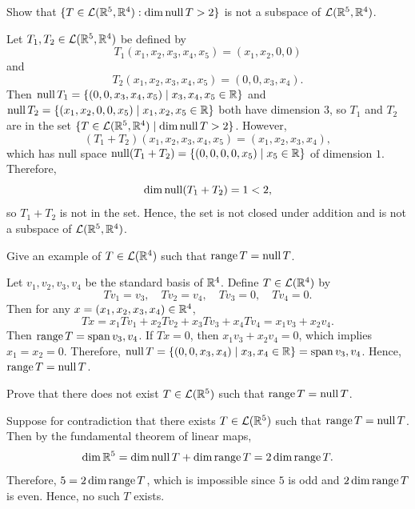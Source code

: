 \begin{exc}
\begin{exercise}
Show that $\{T\in\mathcal{L}(\mathbb{R}^5,\mathbb{R}^4) : \operatorname{dim}\operatorname{null} T>2\}$ is not a subspace of
$\mathcal{L}(\mathbb{R}^5,\mathbb{R}^4)$.
\end{exercise}
\begin{solution}
Let $T_1,T_2\in\mathcal{L}(\mathbb{R}^5,\mathbb{R}^4)$ be defined by
\[ T_1(x_1,x_2,x_3,x_4,x_5)=(x_1,x_2,0,0) \]
and
\[ T_2(x_1,x_2,x_3,x_4,x_5)=(0,0,x_3,x_4). \]
Then $\operatorname{null} T_1=\{(0,0,x_3,x_4,x_5)\mid x_3,x_4,x_5\in\mathbb{R}\}$ and
$\operatorname{null} T_2=\{(x_1,x_2,0,0,x_5)\mid x_1,x_2,x_5\in\mathbb{R}\}$ both have dimension
$3$, so $T_1$ and $T_2$ are in the set
$\{T\in\mathcal{L}(\mathbb{R}^5,\mathbb{R}^4)\mid\operatorname{dim}\operatorname{null} T>2\}$. However,
\[ (T_1+T_2)(x_1,x_2,x_3,x_4,x_5)=(x_1,x_2,x_3,x_4), \]
which has null space $\operatorname{null}(T_1+T_2)=\{(0,0,0,0,x_5)\mid x_5\in\mathbb{R}\}$ of
dimension $1$. Therefore,
\[ \operatorname{dim}\operatorname{null}(T_1+T_2)=1<2, \]
so $T_1+T_2$ is not in the set. Hence, the set is not closed under addition
and is not a subspace of $\mathcal{L}(\mathbb{R}^5,\mathbb{R}^4)$.
\end{solution}

\begin{exercise}
Give an example of $T\in\mathcal{L}(\mathbb{R}^4)$ such that $\operatorname{range} T=\operatorname{null} T$.
\end{exercise}
\begin{solution}
Let $v_1,v_2,v_3,v_4$ be the standard basis of $\mathbb{R}^4$. Define
$T\in\mathcal{L}(\mathbb{R}^4)$ by
\[ Tv_1=v_3, \quad Tv_2=v_4, \quad Tv_3=0, \quad Tv_4=0. \]
Then for any $x=(x_1,x_2,x_3,x_4)\in\mathbb{R}^4$,
\[ Tx=x_1Tv_1+x_2Tv_2+x_3Tv_3+x_4Tv_4=x_1v_3+x_2v_4. \]
Then $\operatorname{range} T=\operatorname{span} v_3,v_4$. If $Tx=0$, then $x_1v_3+x_2v_4=0$, which
implies $x_1=x_2=0$. Therefore,
$\operatorname{null} T=\{(0,0,x_3,x_4)\mid x_3,x_4\in\mathbb{R}\}=\operatorname{span} v_3,v_4$. Hence,
$\operatorname{range} T=\operatorname{null} T$.
\end{solution}

\begin{exercise}
Prove that there does not exist $T\in\mathcal{L}(\mathbb{R}^5)$ such that
$\operatorname{range} T=\operatorname{null} T$.
\end{exercise}
\begin{solution}
Suppose for contradiction that there exists $T\in\mathcal{L}(\mathbb{R}^5)$ such that
$\operatorname{range} T=\operatorname{null} T$. Then by the fundamental theorem of linear maps,
\[ \operatorname{dim}\mathbb{R}^5=\operatorname{dim}\operatorname{null} T+\operatorname{dim}\operatorname{range} T=2\operatorname{dim}\operatorname{range} T. \]
Therefore, $5=2\operatorname{dim}\operatorname{range} T$, which is impossible since $5$ is odd and
$2\operatorname{dim}\operatorname{range} T$ is even. Hence, no such $T$ exists.
\end{solution}


\end{exc}

